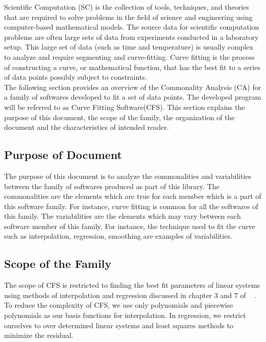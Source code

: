 \documentclass[12pt]{article}
\newcommand{\famname}{CFS} %
\begin{document}
Scientific Computation (SC) is the collection of tools, techniques, and theories that are required to solve problems in the field of science and engineering using computer-based mathematical models. The source data for scientific computation problems are often large sets of data from experiments conducted in a laboratory setup. This large set of data (such as time and temperature) is usually complex to analyze and require segmenting and curve-fitting. Curve fitting is the process of constructing a curve, or mathematical function, that has the best fit to a series of data points possibly subject to constraints.\\

The following section provides an overview of the Commonality Analysis (CA) for a family of softwares developed to fit a set of data points. The developed program will be referred to as Curve Fitting Software(\famname{}). This section explains the purpose of this document, the scope of the family, the organization of the document and the characteristics of intended reader.
 

\subsection{Purpose of Document}
The purpose of this document is to analyze the commonalities and variabilities between the family of softwares produced as part of this library. The commonalities are the elements which are true for each member which is a part of this software family. For instance, curve fitting is common for all the softwares of this family. The variabilities are the elements which may vary between each software member of this family. For instance, the technique used to fit the curve such as interpolation, regression, smoothing are examples of variabilities.


\subsection{Scope of the Family}\label{Scope}
The scope of \famname{} is restricted to finding the best fit parameters of linear systems using methods of interpolation and regression discussed in chapter $3$ and $7$ of ~\cite{Health1997} . To reduce the complexity of \famname{}, we use only polynomials and piecewise polynomials as our basis functions for interpolation. In regression, we restrict ourselves to over determined linear systems and least squares methods to minimize the residual.\\
\end{document}
